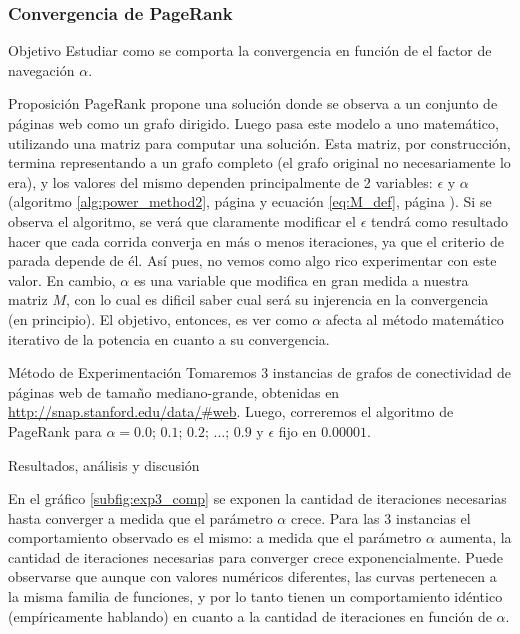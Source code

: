 \subsubsection{Convergencia de PageRank}
\label{subsec:exp3}
\begin{LaTeXdescription}
    \item[Objetivo] Estudiar como se comporta la convergencia en funci\'on de
        el factor de navegaci\'on $\alpha$.\\

    \item[Proposici\'on] PageRank propone una soluci\'on donde se observa a un
        conjunto de p\'aginas web como un grafo dirigido. Luego pasa este modelo
        a uno  matem\'atico, utilizando una matriz para computar una soluci\'on.
        Esta matriz, por construcci\'on, termina representando a un grafo
        completo (el grafo original no necesariamente lo era), y los valores del
        mismo dependen principalmente de 2 variables: $\epsilon$ y $\alpha$
        (algoritmo \ref{alg:power_method2}, p\'agina \pageref{alg:power_method2}
        y ecuaci\'on \ref{eq:M_def}, p\'agina \pageref{eq:M_def}). Si se observa
        el algoritmo, se ver\'a que claramente modificar el $\epsilon$ tendr\'a
        como resultado hacer que cada corrida converja en m\'as o menos
        iteraciones, ya que el criterio de parada depende de \'el. As\'i pues,
        no vemos como algo rico experimentar con este valor. En cambio, $\alpha$
        es una variable que modifica en gran medida a nuestra matriz $M$, con lo
        cual es dificil saber cual ser\'a su injerencia en la convergencia (en
        principio). El objetivo, entonces, es ver como $\alpha$ afecta al
        m\'etodo matem\'atico iterativo de la potencia en cuanto a su
        convergencia.\\

    \item[M\'etodo de Experimentaci\'on] Tomaremos 3 instancias de grafos de
        conectividad de p\'aginas web de tama\~no mediano-grande, obtenidas en
        \url{http://snap.stanford.edu/data/\#web}. Luego, correremos el
        algoritmo de PageRank para $\alpha=0.0$; $0.1$; $0.2$; $\dots$; $0.9$ y
        $\epsilon$ fijo en $0.00001$.\\

    \item[Resultados, an\'alisis y discusi\'on]
\end{LaTeXdescription}

\par En el gráfico \ref{subfig:exp3_comp} se exponen la cantidad de iteraciones
necesarias hasta converger a medida que el parámetro $\alpha$ crece. Para las 3
instancias el comportamiento observado es el mismo: a medida que el par\'ametro
$\alpha$ aumenta, la cantidad de iteraciones necesarias para converger crece
exponencialmente. Puede observarse que aunque con valores numéricos diferentes,
las curvas pertenecen a la misma familia de funciones, y por lo tanto tienen un
comportamiento id\'entico (emp\'iricamente hablando) en cuanto a la cantidad de
iteraciones en funci\'on de $\alpha$.

